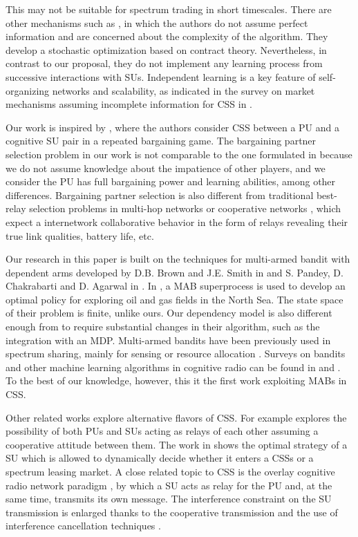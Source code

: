 This may not be suitable for spectrum trading in short timescales. There are other mechanisms such as \cite{ref:Duan2014}, in which the authors do not assume perfect information and are concerned about the complexity of the algorithm. They develop a stochastic optimization based on contract theory. Nevertheless, in contrast to our proposal, they do not implement any learning process from successive interactions with SUs. Independent learning is a key feature of self-organizing networks and scalability, as indicated in the survey on market mechanisms assuming incomplete information for CSS in \cite{ref:Huang2013}.

Our work is inspired by \cite{ref:Yan2013}, where the authors consider CSS between a PU and a cognitive SU pair in a repeated bargaining game. 
The bargaining partner selection problem in our work is not comparable to the one formulated in \cite{ref:Calvo2002} because we do not assume knowledge about the impatience of other players, and we consider the PU has full bargaining power and learning abilities, among other differences. 
Bargaining partner selection is also different from traditional best-relay selection problems in multi-hop networks or cooperative networks \cite{ref:Yuan2013,ref:Tran2014}, which expect a internetwork collaborative behavior in the form of relays revealing their true link qualities, battery life, etc.

Our research in this paper is built on the techniques for multi-armed bandit with dependent arms developed by D.B. Brown and J.E. Smith in \cite{ref:Brown2013} and S. Pandey, D. Chakrabarti and D. Agarwal in \cite{ref:Pandey2007}. In \cite{ref:Brown2013}, a MAB superprocess is used to develop an optimal policy for exploring oil and gas fields in the North Sea. The state space of their problem is finite, unlike ours. 
Our dependency model is also different enough from \cite{ref:Pandey2007} to require substantial changes in their algorithm, such as the integration with an MDP. 
Multi-armed bandits have been previously used in spectrum sharing, mainly for sensing or resource allocation \cite{ref:Si2010}. 
Surveys on bandits and other machine learning algorithms in cognitive radio can be found in \cite{ref:Bkassiny2013} and \cite{ref:Gavrilovska2013}.
To the best of our knowledge, however, this it the first work exploiting MABs in CSS. 

Other related works explore alternative flavors of CSS. For example \cite{ref:Tran2014} explores the possibility of both PUs and SUs acting as relays of each other assuming a cooperative attitude between them. 
The work in \cite{ref:Shao2014} shows the optimal strategy of a SU which is allowed to dynamically decide whether it enters a CSSs or a spectrum leasing market. A close related topic to CSS is the overlay cognitive radio network paradigm \cite{ref:Goldsmith2009}, by which a SU acts as relay for the PU and, at the same time, transmits its own message. 
The interference constraint on the SU transmission is enlarged thanks to the cooperative transmission and the use of interference cancellation techniques \cite{ref:Han2010}. 

